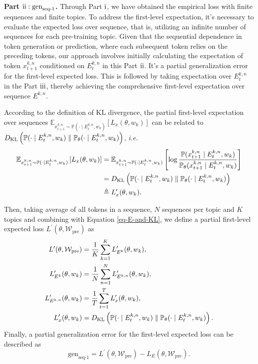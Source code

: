 \textbf{Part $\text{\uppercase\expandafter{\romannumeral2}}: \text{gen}_\text{seq-1}$.} Through Part $\text{\uppercase\expandafter{\romannumeral1}}$, we have obtained the empirical loss with finite sequences and finite topics. To address the first-level expectation, it's necessary to evaluate the expected loss over sequence, that is, utilizing an infinite number of sequences for each pre-training topic. Given that the sequential dependence in token generation or prediction, where each subsequent token relies on the preceding tokens, our approach involves initially calculating the expectation of token $x^{k,n}_{t+1}$ conditioned on $E^{k,n}_{t}$ in this Part $\text{\uppercase\expandafter{\romannumeral2}}$. It's a partial generalization error for the first-level expected loss. This is followed by taking expectation over $E^{k,n}_{t}$ in the Part $\text{\uppercase\expandafter{\romannumeral3}}$, thereby achieving the comprehensive first-level expectation over sequence $E^{k,n}$. 

According to the definition of KL divergence, the partial first-level expectation over sequences $\mathbb{E}_{x^{k,n}_{t+1} \sim \mathbb{P}(\cdot\mid E^{k,n}_t, w_k)}\left[L_{x}(\theta,w_k)\right]$ can be related to $D_{\mathrm{KL}} \left(\mathbb{P}(\cdot\mid E^{k,n}_t, w_k)\parallel \mathbb{P}_\theta(\cdot\mid E^{k,n}_t, w_k)\right)$, \textit{i.e.}
\begin{align}
	\mathbb{E}_{x^{k,n}_{t+1} \sim \mathbb{P}(\cdot\mid E^{k,n}_t, w_k)}\left[L_{x}(\theta,w_k)\right]&=\mathbb{E}_{x^{k,n}_{t+1} \sim \mathbb{P}(\cdot\mid E^{k,n}_t, w_k)}\left[\log\frac{\mathbb{P}(x^{k,n}_{t+1}\mid E^{k,n}_t, w_k)}{\mathbb{P}_\theta(x^{k,n}_{t+1}\mid E^{k,n}_t, w_k)} \right]\nonumber \\
	&=D_{\mathrm{KL}}\left(\mathbb{P}(\cdot\mid E^{k,n}_t, w_k)\parallel \mathbb{P}_\theta(\cdot\mid E^{k,n}_t, w_k)\right)\nonumber  \\
    &\triangleq L^\prime_{x}(\theta,w_k). \label{eq-E-and-KL}
\end{align}

Then, taking average of all tokens in a sequence, $N$ sequences per topic and $K$ topics and combining with Equation \ref{eq-E-and-KL}, we define a partial first-level expected loss $L^\prime(\theta,\mathcal{W}_{\text{pre}})$ as
\begin{align}
	L^\prime(\theta, \mathcal{W}_{\text{pre}})&=\frac{1}{K}\sum_{k=1}^K L^\prime_{E^k}(\theta,w_k), \nonumber \\
	L^\prime_{E^k}(\theta, w_k)&=\frac{1}{N}\sum_{n=1}^N L^\prime_{E^{k,n}}(\theta,w_k), \label{eq-L-E-prime}\\
	L^\prime_{E^{k,n}}(\theta,w_k)&=\frac{1}{T}\sum_{t=1}^T L^\prime_{x}(\theta,w_k), \nonumber \\
    L^\prime_{x}(\theta,w_k)&= D_{\mathrm{KL}}\left(\mathbb{P}(\cdot\mid E^{k,n}_t, w_k)\parallel \mathbb{P}_\theta(\cdot\mid E^{k,n}_t, w_k)\right) \nonumber.
\end{align}
Finally, a partial generalization error for the first-level expected loss can be described as
\begin{equation}\label{eq-gen-pre-1}
	\text{gen}_{\text{seq-1}}=L^\prime(\theta,\mathcal{W}_{\text{pre}})-L_E(\theta,\mathcal{W}_{\text{pre}}).
\end{equation}

